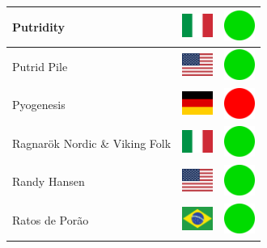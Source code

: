 \documentclass[12pt, a4paper, twoside]{report}
\begin{document}
\begin{center}
\begin{longtable}{|p{5cm}|p{2cm}|p{2cm}|}
 Putridity                                                  & \includegraphics[width=1cm]{../img/flags/it} &   \includegraphics[width=1cm]{../likes/y} \\ \hline
 Putrid Pile                                                & \includegraphics[width=1cm]{../img/flags/us} &   \includegraphics[width=1cm]{../likes/y} \\ \hline
 Pyogenesis                                                 & \includegraphics[width=1cm]{../img/flags/de} &   \includegraphics[width=1cm]{../likes/n} \\ \hline
 Ragnarök Nordic \& Viking Folk                             & \includegraphics[width=1cm]{../img/flags/it} &   \includegraphics[width=1cm]{../likes/y} \\ \hline
 Randy Hansen                                               & \includegraphics[width=1cm]{../img/flags/us} &   \includegraphics[width=1cm]{../likes/y} \\ \hline
 Ratos de Porão                                             & \includegraphics[width=1cm]{../img/flags/br} &   \includegraphics[width=1cm]{../likes/y} \\ \hline

\end{longtable}
\end{center}
\end{document}
